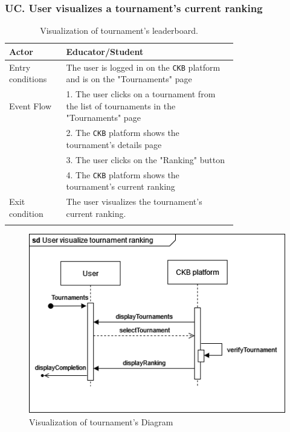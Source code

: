 \subsubsection*{UC\cuc . User visualizes a tournament's current ranking}
\begin{center}
    \begin{longtable}{lp{0.75\linewidth}}
        \hline
        Actor            & Educator/Student \\
        \hline
        Entry conditions & The user is logged in on the \verb|CKB| platform and is on the "Tournaments" page\\
        \hline
        Event Flow      
        & 1. The user clicks on a tournament from the list of tournaments in the "Tournaments" page\\
        & 2. The \verb|CKB| platform shows the tournament's details page\\
        & 3. The user clicks on the "Ranking" button\\
        & 4. The \verb|CKB| platform shows the tournament's current ranking\\
        \hline
        Exit condition   & The user visualizes the tournament's current ranking.   \\ 
        \hline
        \caption{Visualization of tournament's leaderboard.}
        \label{tab: visualization_of_leaderboard_use_case}
    \end{longtable}

    \begin{figure} [H]
        \begin{center}
            \includegraphics[width=0.9\linewidth]{Images/SequenceDiagrams/SD_17.png}
            \caption{Visualization of tournament's Diagram}
            \label{fig: visualization_of_leaderboard_seq_diag}
        \end{center}
    \end{figure}
\end{center}

